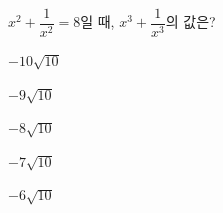 \hspace*{2mm}\begin{minipage}[t]{\dimexpr\linewidth-2mm\relax}\vspace{0pt}
$x^2+\dfrac{1}{x^2}=8$일 때, $x^3+\dfrac{1}{x^3}$의 값은? 
\begin{choices32}{\rule[-3ex]{0pt}{8ex}$-10\sqrt{10}$}{\rule[-3ex]{0pt}{8ex}$-9\sqrt{10}$}{\rule[-3ex]{0pt}{8ex}$-8\sqrt{10}$}{\rule[-3ex]{0pt}{8ex}$-7\sqrt{10}$}{\rule[-3ex]{0pt}{8ex}$-6\sqrt{10}$}\end{choices32}\end{minipage}
